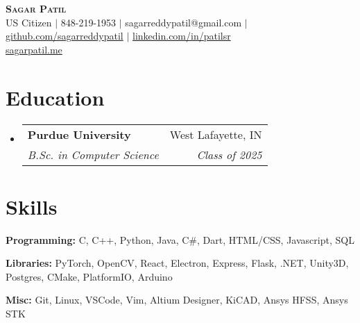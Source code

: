 \documentclass[letterpaper,11pt]{article}
\makeatletter
\newcommand{\resumeSubheading}[4]{
  \vspace{-2pt}\item
    \begin{tabular*}{0.97\textwidth}[t]{l@{\extracolsep{\fill}}r}
      \textbf{#1} & #2 \\
      \textit{\small#3} & \textit{\small #4} \\
    \end{tabular*}\vspace{-7pt}
}
\newcommand{\resumeSubHeadingListStart}{\begin{itemize}[leftmargin=0.15in, label={}]}
\newcommand{\resumeSubHeadingListEnd}{\end{itemize}}
\makeatother
\begin{document}

\begin{center}
  \textbf{\Huge \scshape Sagar Patil} \\ \vspace{3pt}
  \small
  US Citizen
  $|$
  \faMobile \hspace{.5pt} 848-219-1953
  $|$
  \faAt \hspace{.5pt} sagarreddypatil@gmail.com
  $|$
  \faGithub \hspace{.5pt} \href{https://www.github.com/sagarreddypatil}{github.com/sagarreddypatil}
  $|$
  \faLinkedinSquare \hspace{.5pt} \href{https://www.linkedin.com/in/patilsr}{linkedin.com/in/patilsr}
  \\ %
  \faGlobe \hspace{.5pt} \href{https://sagarpatil.me}{sagarpatil.me}
\end{center}




\section{Education}
\vspace{3pt}
\resumeSubHeadingListStart

\resumeSubheading
{Purdue University}{West Lafayette, IN}
{B.Sc. in Computer Science}{Class of 2025}

\resumeSubHeadingListEnd



\section{Skills}
\vspace{2pt}
\resumeSubHeadingListStart
\small{\item{
              \textbf{Programming: }{C, C++, Python, Java, C\#, Dart, HTML/CSS, Javascript, SQL} \\ \vspace{3pt}

              \textbf{Libraries: }{PyTorch, OpenCV, React, Electron, Express, Flask, .NET, Unity3D, Postgres, CMake, PlatformIO, Arduino} \\ \vspace{3pt}

              \textbf{Misc: }{Git, Linux, VSCode, Vim, Altium Designer, KiCAD, Ansys HFSS, Ansys STK}

        }}
\resumeSubHeadingListEnd
\end{document}
